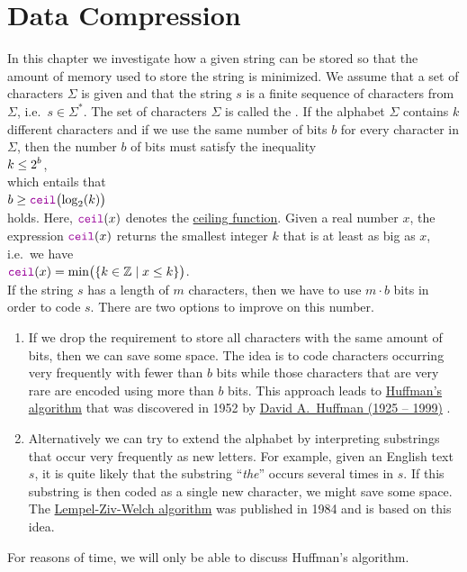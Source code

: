 \chapter{Data Compression}
In this chapter we investigate how a given string can be stored so that the amount of memory used to store the
string is minimized.   We assume that a set of characters $\Sigma$ is given and that the string $s$ is a finite
sequence of characters from $\Sigma$, i.e.~$s \in \Sigma^*$.  The set of characters $\Sigma$ is called the
.  If the alphabet $\Sigma$ contains $k$ different characters and if we use the same number of
bits $b$ for every character in $\Sigma$, then the number $b$ of bits must satisfy the inequality
\\[0.2cm]
\hspace*{1.3cm}
$\displaystyle k \leq 2^b$,
\\[0.2cm]
which entails that 
\\[0.2cm]
\hspace*{1.3cm}
$b \geq \mytt{ceil}\bigl(\log_2(k)\bigr)$
\\[0.2cm]
holds.  Here, $\mytt{ceil}(x)$ denotes the
\href{https://en.wikipedia.org/wiki/Floor_and_ceiling_functions}{ceiling function}.  Given a real number $x$,
the expression $\mytt{ceil}(x)$ returns the smallest integer $k$ that is at least as big as $x$, i.e.~we have
\\[0.2cm]
\hspace*{1.3cm}
$\mytt{ceil}(x) = \min\bigl( \{ k \in \mathbb{Z} \mid x \leq k \}\bigr)$. 
\\[0.2cm]
If the string $s$ has a length of $m$ characters, then we have to use $m \cdot b$ bits in order to code $s$. 
There are two options to improve on this number.
\begin{enumerate}
\item If we drop the requirement to store all characters with the same amount of bits, then we can save some space.
      The idea is to code characters occurring very frequently with fewer than $b$ bits while those characters
      that are very rare are encoded using more than $b$ bits.  This approach leads to 
      \href{https://en.wikipedia.org/wiki/Huffman_coding}{Huffman's algorithm} that was discovered in 1952 by 
      \href{https://en.wikipedia.org/wiki/David_A._Huffman}{David A.~Huffman (1925 -- 1999)} \cite{huffman:52}.
\item Alternatively we can try to extend the alphabet by interpreting substrings that occur very frequently as
      new letters.  For example, given an English text $s$, it is quite likely that the substring 
      ``\emph{the}'' occurs several times in $s$.  If this substring is then coded as a single new character,
      we might save some space.  The 
      \href{https://en.wikipedia.org/wiki/Lempel-Ziv-Welch}{Lempel-Ziv-Welch algorithm} 
      \cite{ziv:77,ziv:78,welch:84} was published in 1984 and is based on this idea.

\end{enumerate}
For reasons of time, we will only be able to discuss Huffman's algorithm.

